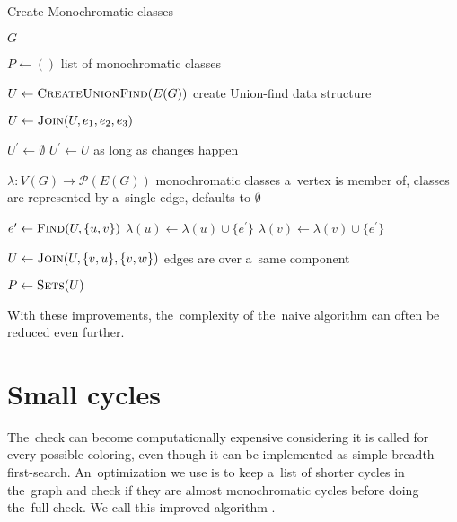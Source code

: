\begin{algorithm}
	\caption[Create Monochromatic classes]{Create Monochromatic classes~\cite{my_paper}}%
	\label{alg:create_monochromatic_classes}
	\begin{algorithmic}[1]
		\Require{} $G$

		\Ensure{} $P \gets ()$
		\Comment{} list of monochromatic classes

		\State{} $U \gets \Call{CreateUnionFind}{E(G)}$
		\Comment{} create Union-find data structure

		\State{} $U \gets \Call{Join}{U, e_{1}, e_{2}, e_{3}}$
		\EndFor{}

		\State{} $U^\prime \gets \emptyset$
		\State{} $U^\prime \gets U$
		\Comment{} as long as changes happen

		\State{} $\lambda : V(G) \to \mathcal{P}(E(G))$
		\Comment{} monochromatic classes a~vertex is member of,
		\State{}
		\Comment{} classes are represented by a~single edge, defaults to $\emptyset$

		\State{} $e^\prime \gets \Call{Find}{U, \{u, v\}}$
		\State{} $\lambda(u) \gets \lambda(u) \cup \{e^\prime\}$
		\State{} $\lambda(v) \gets \lambda(v) \cup \{e^\prime\}$
		\EndFor{}

		\State{} $U \gets \Call{Join}{U, \{v, u\}, \{v, w\}}$
		\Comment{} edges are over a~same component
		\EndIf{}
		\EndFor{}
		\EndWhile{}

		\State{} $P \gets \Call{Sets}{U}$

	\end{algorithmic}
\end{algorithm}

With these improvements, the~complexity of the~naive algorithm can often be
reduced even further.

\section{Small cycles}%
\label{sec:small_cycles}

The~check \IsNACColoring{} can become computationally expensive
considering it is called for every possible coloring,
even though it can be implemented as simple breadth-first-search.
An~optimization we use is to keep a~list of shorter cycles in the~graph and
check if they are almost monochromatic cycles before doing the~full check.
We call this improved \Naive{} algorithm \NaiveCycles{}.

